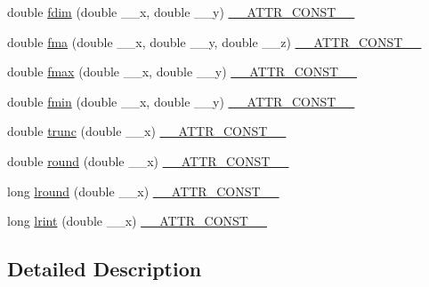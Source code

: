 \begin{DoxyCompactItemize}
\item 
double \hyperlink{group__avr__math_ga83281f9f08e93c6c388623d225ab3096}{fdim} (double \+\_\+\+\_\+x, double \+\_\+\+\_\+y) \hyperlink{group__avr__math_ga87f6b1b3880d945610873b9da382e5d4}{\+\_\+\+\_\+\+A\+T\+T\+R\+\_\+\+C\+O\+N\+S\+T\+\_\+\+\_\+}
\item 
double \hyperlink{group__avr__math_ga82029dbf001eaea490ba44d439cbd660}{fma} (double \+\_\+\+\_\+x, double \+\_\+\+\_\+y, double \+\_\+\+\_\+z) \hyperlink{group__avr__math_ga87f6b1b3880d945610873b9da382e5d4}{\+\_\+\+\_\+\+A\+T\+T\+R\+\_\+\+C\+O\+N\+S\+T\+\_\+\+\_\+}
\item 
double \hyperlink{group__avr__math_ga826d43c13b1800b7c906bd35e31ee15f}{fmax} (double \+\_\+\+\_\+x, double \+\_\+\+\_\+y) \hyperlink{group__avr__math_ga87f6b1b3880d945610873b9da382e5d4}{\+\_\+\+\_\+\+A\+T\+T\+R\+\_\+\+C\+O\+N\+S\+T\+\_\+\+\_\+}
\item 
double \hyperlink{group__avr__math_gae5e2dea618087cda44f0998821c26c48}{fmin} (double \+\_\+\+\_\+x, double \+\_\+\+\_\+y) \hyperlink{group__avr__math_ga87f6b1b3880d945610873b9da382e5d4}{\+\_\+\+\_\+\+A\+T\+T\+R\+\_\+\+C\+O\+N\+S\+T\+\_\+\+\_\+}
\item 
double \hyperlink{group__avr__math_ga63f7d01fc9b6a91bca4f71089213ea42}{trunc} (double \+\_\+\+\_\+x) \hyperlink{group__avr__math_ga87f6b1b3880d945610873b9da382e5d4}{\+\_\+\+\_\+\+A\+T\+T\+R\+\_\+\+C\+O\+N\+S\+T\+\_\+\+\_\+}
\item 
double \hyperlink{group__avr__math_ga79dbf1906373fcc3bf5edf1ec91674cc}{round} (double \+\_\+\+\_\+x) \hyperlink{group__avr__math_ga87f6b1b3880d945610873b9da382e5d4}{\+\_\+\+\_\+\+A\+T\+T\+R\+\_\+\+C\+O\+N\+S\+T\+\_\+\+\_\+}
\item 
long \hyperlink{group__avr__math_gaf3029ef77cd160704ed157c0353cd631}{lround} (double \+\_\+\+\_\+x) \hyperlink{group__avr__math_ga87f6b1b3880d945610873b9da382e5d4}{\+\_\+\+\_\+\+A\+T\+T\+R\+\_\+\+C\+O\+N\+S\+T\+\_\+\+\_\+}
\item 
long \hyperlink{group__avr__math_gab6b0c151da73204150528ee81ef45e02}{lrint} (double \+\_\+\+\_\+x) \hyperlink{group__avr__math_ga87f6b1b3880d945610873b9da382e5d4}{\+\_\+\+\_\+\+A\+T\+T\+R\+\_\+\+C\+O\+N\+S\+T\+\_\+\+\_\+}
\end{DoxyCompactItemize}


\subsection{Detailed Description}


